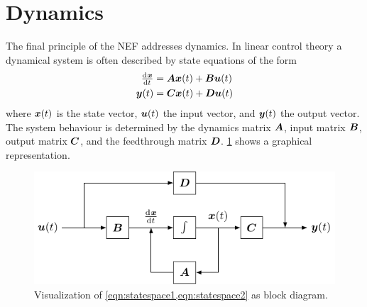 \section{Dynamics}
The final principle of the NEF addresses dynamics.
In linear control theory a dynamical system is often described by state equations of the form
\begin{align}
    \od{\vc x}{t} &= \mat A \vc x(t) + \mat B \vc u(t) \label{eqn:statespace1} \\
    \vc y(t) &= \mat C \vc x(t) + \mat D \vc u(t) \label{eqn:statespace2}
\end{align}
where $\bm{x}(t)$ is the state vector, $\bm{u}(t)$ the input vector, and $\bm{y}(t)$ the output vector.
The system behaviour is determined by the dynamics matrix $\bm{A}$, input matrix $\bm{B}$, output matrix $\bm{C}$, and the feedthrough matrix $\bm{D}$.
\cref{fig:statespace} shows a graphical representation.
\begin{figure}
    \centering
    \includegraphics{tikz/statespace}
    \caption{Visualization of \cref{eqn:statespace1,eqn:statespace2} as block diagram.}\label{fig:statespace}
\end{figure}

